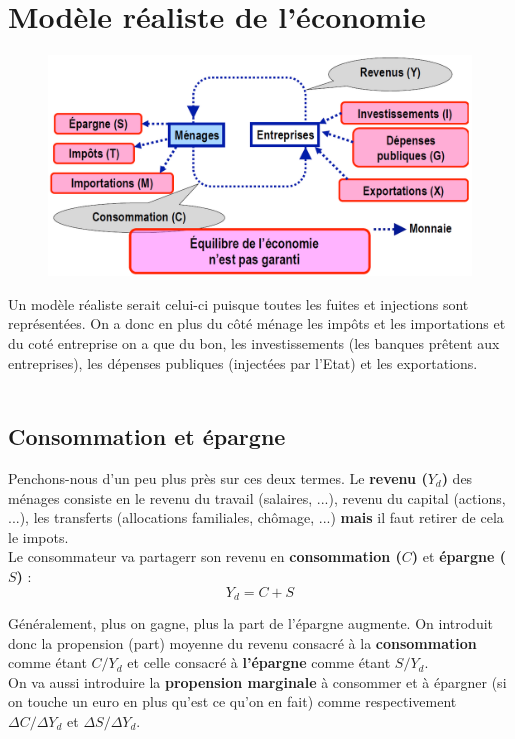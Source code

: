 \section{Modèle réaliste de l'économie}
\begin{figure}
	\includegraphics[scale=0.3]{54}
\end{figure}
Un modèle réaliste serait celui-ci puisque toutes les fuites et injections sont représentées. On a donc en plus du côté ménage les impôts et les importations et du coté entreprise on a que du bon, les investissements (les banques prêtent aux entreprises), les dépenses publiques (injectées par l'Etat) et les exportations. \\\\

\subsection{Consommation et épargne}
Penchons-nous d'un peu plus près sur ces deux termes. Le \textbf{revenu ($Y_d$)} des ménages consiste en le revenu du travail (salaires, ...), revenu du capital (actions, ...), les transferts (allocations familiales, chômage, ...) \textbf{mais} il faut retirer de cela le impots. \\
Le consommateur va partagerr son revenu en \textbf{consommation ($C$)} et \textbf{épargne ($S$)} : 
\begin{equation}
	Y_d = C + S
\end{equation}

Généralement, plus on gagne, plus la part de l'épargne augmente. On introduit donc la propension (part) moyenne du revenu consacré à la \textbf{consommation} comme étant $C/Y_d$ et celle consacré à \textbf{l'épargne} comme étant $S/Y_d$. \\
On va aussi introduire la \textbf{propension marginale} à consommer et à épargner (si on touche un euro en plus qu'est ce qu'on en fait) comme respectivement $\Delta C/\Delta Y_d$ et $\Delta S/\Delta Y_d$.

